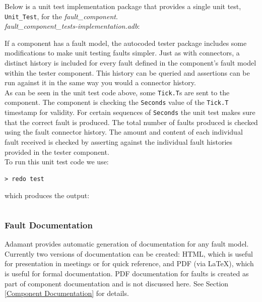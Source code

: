 Below is a unit test implementation package that provides a single unit test, \texttt{Unit\_Test}, for the \textit{fault\_component}. \\

\textit{fault\_component\_tests-implementation.adb}:

If a component has a fault model, the autocoded tester package includes some modifications to make unit testing faults simpler. Just as with connectors, a distinct history is included for every fault defined in the component's fault model within the tester component. This history can be queried and assertions can be run against it in the same way you would a connector history. \\

As can be seen in the unit test code above, some \texttt{Tick.T}s are sent to the component. The component is checking the \texttt{Seconds} value of the \texttt{Tick.T} timestamp for validity. For certain sequences of \texttt{Seconds} the unit test makes sure that the correct fault is produced. The total number of faults produced is checked using the fault connector history. The amount and content of each individual fault received is checked by asserting against the individual fault histories provided in the tester component. \\

To run this unit test code we use:

\vspace{5mm} %
\begin{verbatim}
> redo test
\end{verbatim}
\vspace{5mm} %

which produces the output:

\vspace{5mm} %
\inputminted{text}{../example_architecture/event_component/test/output.txt}
\vspace{5mm} %

\subsubsection{Fault Documentation}

Adamant provides automatic generation of documentation for any fault model. Currently two versions of documentation can be created: HTML, which is useful for presentation in meetings or for quick reference, and PDF (via \LaTeX), which is useful for formal documentation. PDF documentation for faults is created as part of component documentation and is not discussed here. See Section \ref{Component Documentation} for details. \\

